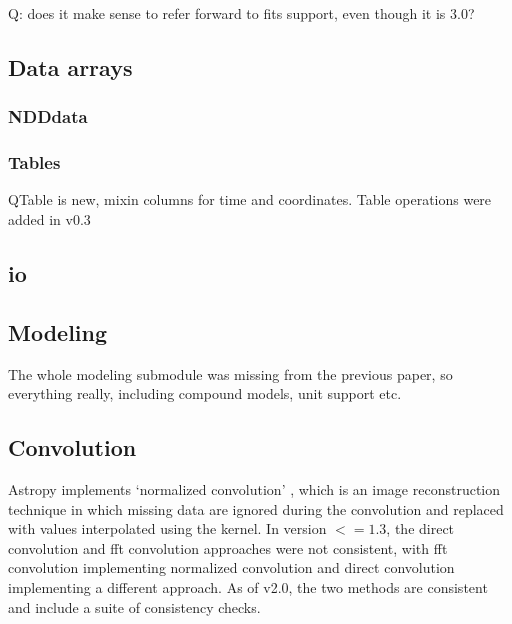 \documentclass[modern]{aastex61}
\begin{document}
Q: does it make sense to refer forward to fits support, even though it is 3.0?

\subsection{Data arrays}

\subsubsection{NDDdata}

\subsubsection{Tables}
\label{sec:table}
QTable is new, mixin columns for time and coordinates. Table operations were added in v0.3

\subsection{io}



\subsection{Modeling}
\label{sec:modeling}
The whole modeling submodule was missing from the previous paper, so everything really, including compound models, unit support etc.

\subsection{Convolution}

Astropy implements `normalized convolution' \citep[e.g.,][]{Knutsson1993}, which is an image reconstruction technique in which missing data are ignored during the convolution and replaced with values interpolated using the kernel.   In version $<=1.3$, the direct convolution and fft convolution approaches were not consistent, with fft convolution implementing normalized convolution and direct convolution implementing a different approach.  As of v2.0, the two methods are consistent and include a suite of consistency checks.
\end{document}
